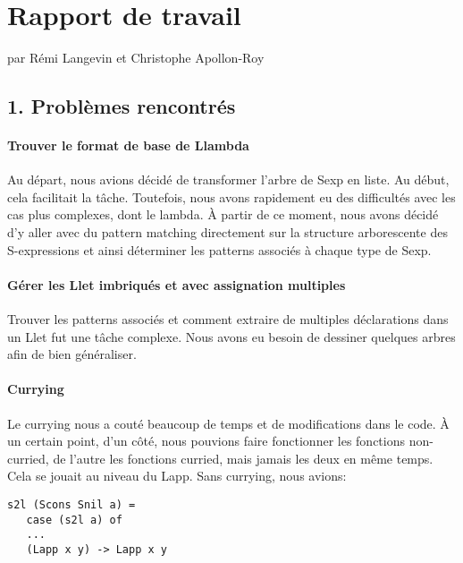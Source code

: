 \section{Rapport de travail}\label{rapport-de-travail}

par Rémi Langevin et Christophe Apollon-Roy

\subsection{1. Problèmes rencontrés}\label{problemes-rencontres}

\paragraph{Trouver le format de base de
Llambda}\label{trouver-le-format-de-base-de-llambda}

Au départ, nous avions décidé de transformer l'arbre de Sexp en liste.
Au début, cela facilitait la tâche. Toutefois, nous avons rapidement eu
des difficultés avec les cas plus complexes, dont le lambda. À partir de
ce moment, nous avons décidé d'y aller avec du pattern matching
directement sur la structure arborescente des S-expressions et ainsi
déterminer les patterns associés à chaque type de Sexp.

\paragraph{Gérer les Llet imbriqués et avec assignation
multiples}\label{guxe9rer-les-llet-imbriques-et-avec-assignation-multiples}

Trouver les patterns associés et comment extraire de multiples
déclarations dans un Llet fut une tâche complexe. Nous avons eu besoin
de dessiner quelques arbres afin de bien généraliser.

\paragraph{Currying}\label{currying}

Le currying nous a couté beaucoup de temps et de modifications dans le
code. À un certain point, d'un côté, nous pouvions faire fonctionner les
fonctions non-curried, de l'autre les fonctions curried, mais jamais les
deux en même temps. Cela se jouait au niveau du Lapp. Sans currying,
nous avions:

\begin{verbatim}
s2l (Scons Snil a) =
   case (s2l a) of
   ...
   (Lapp x y) -> Lapp x y
\end{verbatim}

